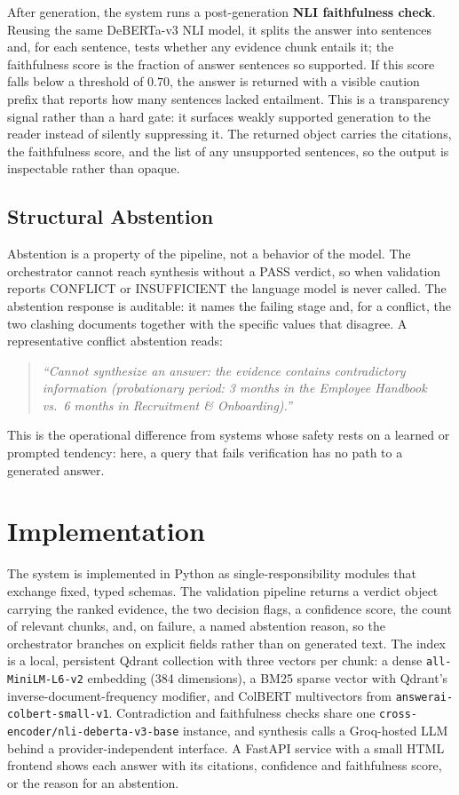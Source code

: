 \documentclass[conference]{IEEEtran}
\begin{document}
After generation, the system runs a post-generation \textbf{NLI
faithfulness check}. Reusing the same DeBERTa-v3 NLI model, it splits the
answer into sentences and, for each sentence, tests whether any evidence
chunk entails it; the faithfulness score is the fraction of answer
sentences so supported. If this score falls below a threshold of $0.70$,
the answer is returned with a visible caution prefix that reports how many
sentences lacked entailment. This is a transparency signal rather than a
hard gate: it surfaces weakly supported generation to the reader instead of
silently suppressing it. The returned object carries the citations, the
faithfulness score, and the list of any unsupported sentences, so the
output is inspectable rather than opaque.

\subsection{Structural Abstention}
\label{sec:abstention}
Abstention is a property of the pipeline, not a behavior of the model. The
orchestrator cannot reach synthesis without a PASS verdict, so when
validation reports CONFLICT or INSUFFICIENT the language model is never
called. The abstention response is auditable: it names the failing stage
and, for a conflict, the two clashing documents together with the specific
values that disagree. A representative conflict abstention reads:
\begin{quote}\small\itshape
``Cannot synthesize an answer: the evidence contains contradictory
information (probationary period: 3 months in the Employee Handbook vs.\
6 months in Recruitment \& Onboarding).''
\end{quote}
This is the operational difference from systems whose safety rests on a
learned or prompted tendency: here, a query that fails verification has no
path to a generated answer.

\section{Implementation}
\label{sec:impl}

The system is implemented in Python as single-responsibility modules that
exchange fixed, typed schemas. The validation pipeline returns a verdict
object carrying the ranked evidence, the two decision flags, a confidence
score, the count of relevant chunks, and, on failure, a named abstention
reason, so the orchestrator branches on explicit fields rather than on
generated text. The index is a local, persistent Qdrant collection with
three vectors per chunk: a dense \texttt{all-MiniLM-L6-v2} embedding (384
dimensions), a BM25 sparse vector with Qdrant's inverse-document-frequency
modifier, and ColBERT multivectors from \texttt{answerai-colbert-small-v1}.
Contradiction and faithfulness checks share one
\texttt{cross-encoder/nli-deberta-v3-base} instance, and synthesis calls a
Groq-hosted LLM behind a provider-independent interface. A FastAPI service
with a small HTML frontend shows each answer with its citations, confidence
and faithfulness score, or the reason for an abstention.
\end{document}
